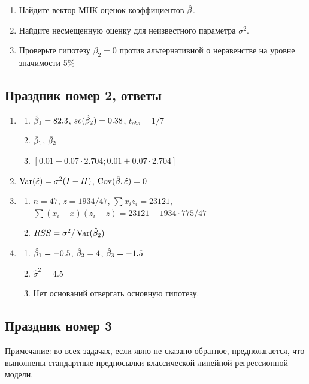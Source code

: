 \documentclass[12pt, a4paper]{article}\usepackage[]{graphicx}\usepackage[]{color}
\begin{document}
\begin{enumerate}
\begin{enumerate}
\item Найдите вектор МНК-оценок коэффициентов $\hat{\beta}$.
\item Найдите несмещенную оценку для неизвестного параметра $\sigma^2$.
\item Проверьте гипотезу $\beta_2=0$ против альтернативной о неравенстве на уровне значимости 5\%
\end{enumerate}


\end{enumerate}



\subsection{Праздник номер 2, ответы}

\begin{enumerate}
\item
\begin{enumerate}
\item $\hat{\beta}_1 = 82.3$, $se(\hat{\beta}_2) = 0.38$, $t_{obs} = 1/7$
\item $\hat{\beta}_1$, $\hat{\beta}_2$
\item $[0.01 - 0.07 \cdot 2.704; 0.01 + 0.07 \cdot 2.704]$
\end{enumerate}
\item $\operatorname{Var}(\hat{\varepsilon}) = \sigma^2 (I - H)$, $\operatorname{Cov}(\hat{\beta},\hat{\varepsilon}) = 0$
\item
\begin{enumerate}
\item $n = 47$, $\bar{z} = 1934 / 47$, $\sum x_i z_i = 23121$, $\sum(x_i-\bar{x})(z_i-\bar{z}) = 23121 - 1934 \cdot 775 / 47$
\item $RSS = \sigma^2 / \operatorname{Var}(\hat{\beta}_2)$
\end{enumerate}
\item
\begin{enumerate}
\item $\hat{\beta}_1 = -0.5$, $\hat{\beta}_2 = 4$, $\hat{\beta}_3 = -1.5$
\item $\hat{\sigma}^2 = 4.5$
\item Нет оснований отвергать основную гипотезу.
\end{enumerate}
\end{enumerate}




\subsection{Праздник номер 3}
Примечание: во всех задачах, если явно не сказано обратное, предполагается, что выполнены стандартные предпосылки классической линейной регрессионной модели.
\end{document}
